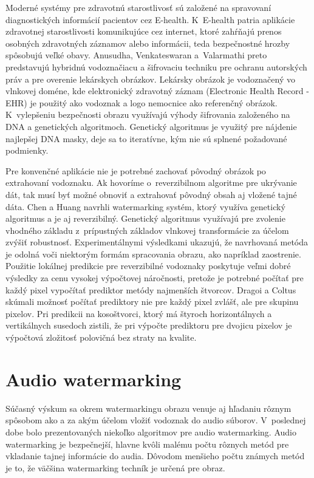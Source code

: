 Moderné systémy pre zdravotnú starostlivosť sú založené na spravovaní diagnostických informácií pacientov cez E-health. K~E-health patria aplikácie zdravotnej starostlivosti komunikujúce cez internet, ktoré zahŕňajú prenos osobných zdravotných záznamov alebo informácii, teda bezpečnostné hrozby spôsobujú veľké obavy. Anusudha, Venkateswaran a~Valarmathi \cite{Anusudha2017} preto predstavujú hybridnú vodoznačiacu a šifrovaciu techniku pre ochranu autorských práv a pre overenie lekárskych obrázkov. Lekársky obrázok je vodoznačený vo vlnkovej doméne, kde elektronický zdravotný záznam (Electronic Health Record - EHR) je použitý ako vodoznak a logo nemocnice ako referenčný obrázok. K~vylepšeniu bezpečnosti obrazu využívajú výhody šifrovania založeného na DNA a genetických algoritmoch. Genetický algoritmus je využitý pre nájdenie najlepšej DNA masky, deje sa to iteratívne, kým nie sú splnené požadované podmienky.

Pre konvenčné aplikácie nie je potrebné zachovať pôvodný obrázok po extrahovaní vodoznaku. Ak hovoríme o~reverzibilnom algoritme pre ukrývanie dát, tak musí byť možné obnoviť a extrahovať pôvodný obsah aj vložené tajné dáta. Chen a Huang \cite{Chen2014} navrhli watermarking systém, ktorý využíva genetický algoritmus a je aj reverzibilný. Genetický algoritmus využívajú pre zvolenie vhodného základu z~prípustných základov vlnkovej transformácie za účelom zvýšiť robustnosť.
Experimentálnymi výsledkami ukazujú, že navrhovaná metóda je odolná voči niektorým formám spracovania obrazu, ako napríklad zaostrenie.
Použitie lokálnej predikcie pre reverzibilné vodoznaky poskytuje veľmi dobré výsledky za cenu vysokej výpočtovej náročnosti, pretože je potrebné počítať pre každý pixel vypočítať prediktor metódy najmenších štvorcov. Dragoi a Coltus \cite{Dragoi2015} skúmali možnosť počítať prediktory nie pre každý pixel zvlášť, ale pre skupinu pixelov. Pri predikcii na kosoštvorci, ktorý má štyroch horizontálnych a vertikálnych susedoch zistili, že pri výpočte prediktoru pre dvojicu pixelov je výpočtová zložitosť polovičná bez straty na kvalite.

\section{Audio watermarking}
Súčasný výskum sa okrem watermarkingu obrazu venuje aj hľadaniu rôznym spôsobom ako a za akým účelom vložiť vodoznak do audio súborov.
V~poslednej dobe bolo prezentovaných niekoľko algoritmov pre audio watermarking. Audio watermarking je bezpečnejší, hlavne kvôli malému počtu rôznych metód pre vkladanie tajnej informácie do audia. Dôvodom menšieho počtu známych metód je to, že väčšina watermarking techník je určená pre obraz. \cite{Zamani2015}

